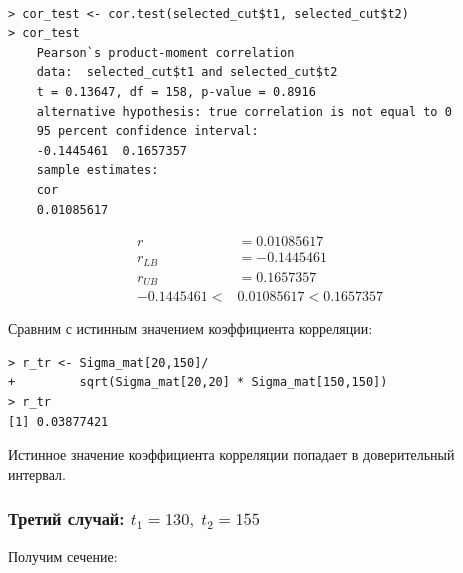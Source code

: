 \documentclass[14pt,a4paper]{scrartcl}
\begin{document}
\begin{figure}[H]
	\begin{minipage}[h]{1\linewidth}
		  \\
	\end{minipage}
\end{figure}

\begin{verbatim}
> cor_test <- cor.test(selected_cut$t1, selected_cut$t2)
> cor_test
	Pearson`s product-moment correlation
	data:  selected_cut$t1 and selected_cut$t2
	t = 0.13647, df = 158, p-value = 0.8916
	alternative hypothesis: true correlation is not equal to 0
	95 percent confidence interval:
	-0.1445461  0.1657357
	sample estimates:
	cor 
	0.01085617 
\end{verbatim}
\begin{align*}
	r &= 0.01085617 \\
	r_{LB} &= -0.1445461\\
	r_{UB} &= 0.1657357\\
	-0.1445461 < &0.01085617 < 0.1657357
\end{align*}


Сравним с истинным значением коэффициента корреляции:
\begin{verbatim}
> r_tr <- Sigma_mat[20,150]/
+         sqrt(Sigma_mat[20,20] * Sigma_mat[150,150])
> r_tr
[1] 0.03877421
\end{verbatim}

Истинное значение коэффициента корреляции попадает в доверительный интервал.





\pagebreak
\subsubsection*{Третий случай: $t_1 = 130, \; t_2 = 155$}
Получим сечение:
\end{document}
